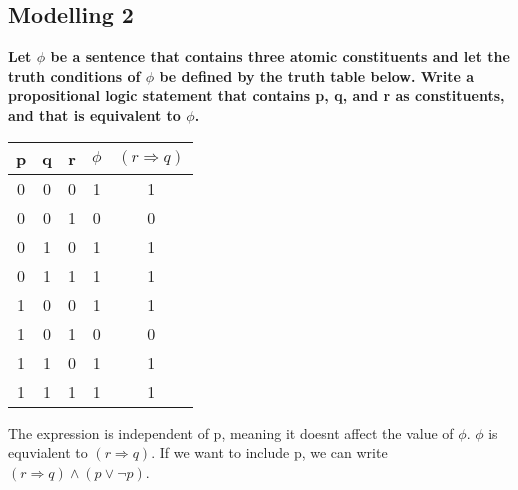\subsection{Modelling 2}
\begin{large}
  \textbf{Let $\phi$ be a sentence that contains three atomic constituents and let the truth conditions of $\phi$ be defined
    by the truth table below. Write a propositional logic statement that contains p, q, and r as constituents,
    and that is equivalent to $\phi$.}

  \begin{tabular}{c|c|c||c||c}
    p & q & r & $ \phi$ & $ (r \Rightarrow q) $ \\
    \hline\hline
    0 & 0 & 0 & 1       & 1                     \\
    \hline
    0 & 0 & 1 & 0       & 0                     \\
    \hline
    0 & 1 & 0 & 1       & 1                     \\
    \hline
    0 & 1 & 1 & 1       & 1                     \\
    \hline
    1 & 0 & 0 & 1       & 1                     \\
    \hline
    1 & 0 & 1 & 0       & 0                     \\
    \hline
    1 & 1 & 0 & 1       & 1                     \\
    \hline
    1 & 1 & 1 & 1       & 1                     \\
    \hline
  \end{tabular}

  The expression is independent of p, meaning it doesnt affect the value of $\phi$. $\phi$ is equvialent to $(r \Rightarrow q)$. If we want to include p, we can write $ (r \Rightarrow q)  \land (p \lor \neg p) $.
\end{large}